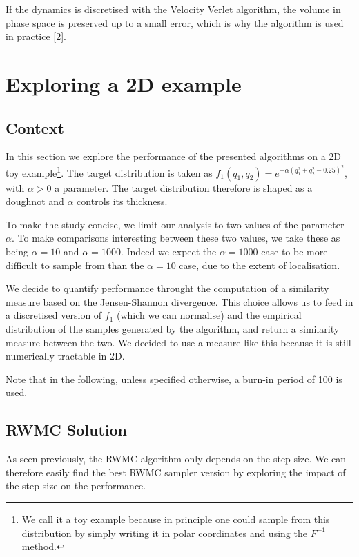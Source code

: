 \documentclass[a4paper, 12pt,oneside]{article}
\begin{document}
			If the dynamics is discretised with the Velocity Verlet algorithm, the volume in phase space is preserved up to a small error, which is why the algorithm is used in practice [2].
	\section{Exploring a 2D example}
		\subsection{Context}
		In this section we explore the performance of the presented algorithms on a 2D toy example\footnote{We call it a toy example because in principle one could sample from this distribution by simply writing it in polar coordinates and using the $F^{-1}$ method.}. The target distribution is taken as $f_1(q_1,q_2)=e^{-\alpha(q_1^2+q_2^2-0.25)^2}$, with $\alpha>0$ a parameter. The target distribution therefore is shaped as a doughnot and $\alpha$ controls its thickness. 
		
		To make the study concise, we limit our analysis to two values of the parameter $\alpha$. To make comparisons interesting between these two values, we take these as being $\alpha =10$ and $\alpha=1000$. Indeed we expect the $\alpha=1000$ case to be more difficult to sample from than the $\alpha=10$ case, due to the extent of localisation.

		We decide to quantify performance throught the computation of a similarity measure based on the Jensen-Shannon divergence. This choice allows us to feed in a discretised version of $f_1$ (which we can normalise) and the empirical distribution of the samples generated by the algorithm, and return a similarity measure between the two. We decided to use a measure like this because it is still numerically tractable in 2D.  

		Note that in the following, unless specified otherwise, a burn-in period of 100 is used. 
		\subsection{RWMC Solution}
			As seen previously, the RWMC algorithm only depends on the step size. We can therefore easily find the best RWMC sampler version by exploring the impact of the step size on the performance. 
\end{document}
